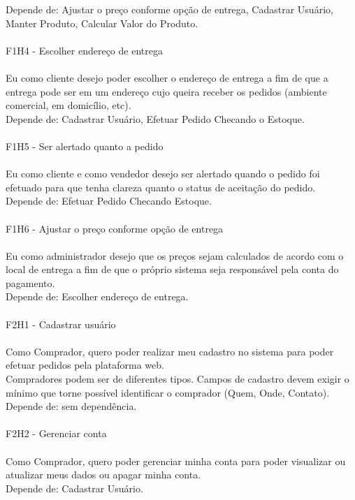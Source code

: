 \tab Depende de: Ajustar o preço conforme opção de entrega, Cadastrar Usuário, Manter Produto, Calcular Valor do Produto.\\
\\
\tab F1H4 - Escolher endereço de entrega\\
\\
\tab Eu como cliente desejo poder escolher o endereço de entrega a fim de que a entrega pode ser em um endereço cujo queira receber os pedidos (ambiente comercial, em domicílio, etc).\\
\tab Depende de: Cadastrar Usuário, Efetuar Pedido Checando o Estoque.\\
\\
\tab F1H5 - Ser alertado quanto a pedido\\
\\
\tab Eu como cliente e como vendedor desejo ser alertado quando o pedido foi efetuado para que tenha clareza quanto o status de aceitação do pedido.\\
\tab Depende de: Efetuar Pedido Checando Estoque.\\
\\
\tab F1H6 - Ajustar o preço conforme opção de entrega\\
\\
\tab Eu como administrador desejo que os preços sejam calculados de acordo com o local de entrega a fim de que o próprio sistema seja responsável pela conta do pagamento.\\
\tab Depende de: Escolher endereço de entrega.\\
\\
\tab F2H1 - Cadastrar usuário\\
\\
\tab Como Comprador, quero poder realizar meu cadastro no sistema para poder efetuar pedidos pela plataforma web.\\
\tab Compradores podem ser de diferentes tipos. Campos de cadastro devem exigir o mínimo que torne possível identificar o comprador (Quem, Onde, Contato).\\
\tab Depende de: sem dependência.\\
\\
\tab F2H2 - Gerenciar conta\\
\\
\tab Como Comprador, quero poder gerenciar minha conta para poder visualizar ou atualizar meus dados ou apagar minha conta.\\
\tab Depende de: Cadastrar Usuário.\\
\\
